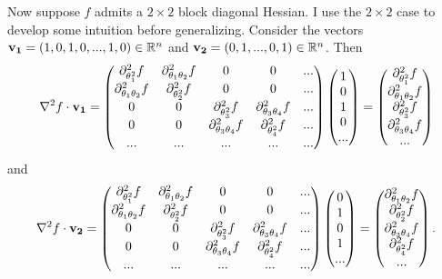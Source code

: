 \documentclass[stslayout, noinfoline]{imsart}
\theoremstyle{definition}
\begin{document}
Now suppose $f$ admits a $2 \times 2$ block diagonal Hessian.
I use the $2 \times 2$ case to develop some intuition before generalizing.
Consider the vectors ${\bf v_1} = (1, 0, 1, 0, ..., 1, 0) \in \mathbb R^n$ and ${\bf v_2} = (0, 1, ..., 0, 1) \in \mathbb R^n$.
Then
\begin{equation*}
  \nabla^2 f \cdot {\bf v_1} = \begin{pmatrix} \partial^2_{\theta_1^2} f & \partial^2_{\theta_1 \theta_2} f & 0 & 0 & ... \\ 
   \partial^2_{\theta_1 \theta_2} f & \partial^2_{\theta_2^2} f  & 0 & 0 & ... \\
   0 & 0 & \partial^2_{\theta_3^2} f & \partial^2_{\theta_3 \theta_4} f & ... \\
   0 & 0 & \partial^2_{\theta_3 \theta_4} f & \partial^2_{\theta_4^2} f & ... \\
   . . . & ... & ... & ... & ...
   \end{pmatrix}
   \begin{pmatrix} 1 \\ 0 \\ 1 \\ 0 \\ ... \end{pmatrix}
   = \begin{pmatrix} \partial^2_{\theta_1^2} f \\
         \partial^2_{\theta_1 \theta_2} f \\
         \partial^2_{\theta_3^2} f \\
         \partial^2_{\theta_3 \theta_4} f \\
         ...
      \end{pmatrix}
\end{equation*}
and
\begin{equation*}
  \nabla^2 f \cdot {\bf v_2} = \begin{pmatrix} \partial^2_{\theta_1^2} f & \partial^2_{\theta_1 \theta_2} f & 0 & 0 & ... \\ 
   \partial^2_{\theta_1 \theta_2} f & \partial^2_{\theta_2^2} f  & 0 & 0 & ... \\
   0 & 0 & \partial^2_{\theta_3^2} f & \partial^2_{\theta_3 \theta_4} f & ... \\
   0 & 0 & \partial^2_{\theta_3 \theta_4} f & \partial^2_{\theta_4^2} f & ... \\
   . . . & ... & ... & ... & ...
   \end{pmatrix}
   \begin{pmatrix} 0 \\ 1 \\ 0 \\ 1 \\ ... \end{pmatrix}
   = \begin{pmatrix} \partial^2_{\theta_1 \theta_2} f \\
         \partial^2_{\theta_2^2} f \\
         \partial^2_{\theta_3 \theta_4} f \\
         \partial^2_{\theta_4^2} f \\
         ...
      \end{pmatrix}.
\end{equation*}
\end{document}
